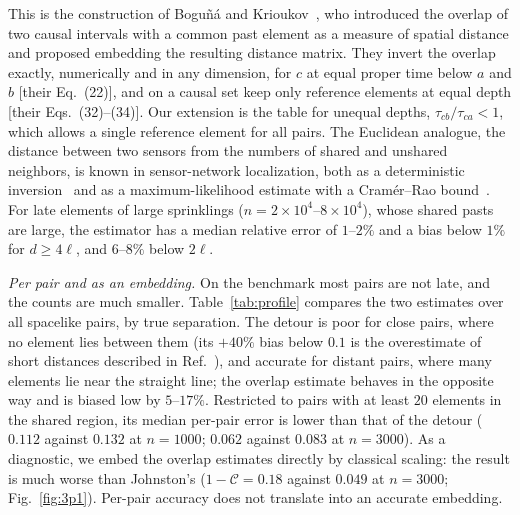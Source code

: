 \documentclass[prd,twocolumn,superscriptaddress,nofootinbib,amsmath,amssymb,floatfix]{revtex4-2}
\begin{document}
This is the construction of Bogu\~n\'a and Krioukov~\cite{BK24}, who introduced the overlap of two causal intervals with a common past element as a measure of spatial distance and proposed embedding the resulting distance matrix. They invert the overlap exactly, numerically and in any dimension, for $c$ at equal proper time below $a$ and $b$ [their Eq.~(22)], and on a causal set keep only reference elements at equal depth [their Eqs.~(32)--(34)]. Our extension is the table for unequal depths, $\tau_{cb}/\tau_{ca}<1$, which allows a single reference element for all pairs. The Euclidean analogue, the distance between two sensors from the numbers of shared and unshared neighbors, is known in sensor-network localization, both as a deterministic inversion~\cite{Buschmann06} and as a maximum-likelihood estimate with a Cram\'er--Rao bound~\cite{Huang14}. For late elements of large sprinklings ($n=2\times10^4$--$8\times10^4$), whose shared pasts are large, the estimator has a median relative error of $1$--$2\%$ and a bias below $1\%$ for $d\geq4\ell$, and $6$--$8\%$ below $2\ell$.

\emph{Per pair and as an embedding.} On the benchmark most pairs are not late, and the counts are much smaller. Table~\ref{tab:profile} compares the two estimates over all spacelike pairs, by true separation. The detour is poor for close pairs, where no element lies between them (its $+40\%$ bias below $0.1$ is the overestimate of short distances described in Ref.~\cite{ESV19}), and accurate for distant pairs, where many elements lie near the straight line; the overlap estimate behaves in the opposite way and is biased low by $5$--$17\%$. Restricted to pairs with at least $20$ elements in the shared region, its median per-pair error is lower than that of the detour ($0.112$ against $0.132$ at $n=1000$; $0.062$ against $0.083$ at $n=3000$). As a diagnostic, we embed the overlap estimates directly by classical scaling: the result is much worse than Johnston's ($1-\mathcal C=0.18$ against $0.049$ at $n=3000$; Fig.~\ref{fig:3p1}). Per-pair accuracy does not translate into an accurate embedding.
\end{document}
